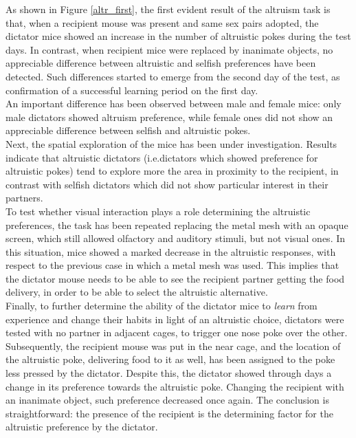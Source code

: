 \documentclass[12pt, a4paper]{article}
\begin{document}
As shown in Figure \ref{altr_first}, the first evident result of the altruism task is that, when a recipient mouse was present and same sex pairs adopted, the dictator mice showed an increase in the number of altruistic pokes during the test days. In contrast, when recipient mice were replaced by inanimate objects, no appreciable difference between altruistic and selfish preferences have been detected. Such differences started to emerge from the second day of the test, as confirmation of a successful learning period on the first day. \\
An important difference has been observed between male and female mice:  only male dictators showed altruism preference, while female ones did not show an appreciable difference between selfish and altruistic pokes.\\
Next, the spatial exploration of the mice has been under investigation. Results indicate that altruistic dictators (i.e.dictators which showed preference for altruistic pokes) tend to explore more the area in proximity to the recipient, in contrast with selfish dictators which did not show particular interest in their partners.\\
To test whether visual interaction plays a role determining the altruistic preferences, the task has been repeated replacing the metal mesh with an opaque screen, which still allowed olfactory and auditory stimuli, but not visual ones. In this situation, mice showed a marked decrease in the altruistic responses, with respect to the previous case in which a metal mesh was used. This implies that the dictator mouse needs to be able to see the recipient partner getting the food delivery, in order to be able to select the altruistic alternative.\\
Finally, to further determine the ability of the dictator mice to \textit{learn} from experience and change their habits in light of an altruistic choice, dictators were tested with no partner in adjacent cages, to trigger one nose poke over the other. Subsequently, the recipient mouse was put in the near cage, and the location of the altruistic poke, delivering food to it as well, has been assigned to the poke less pressed by the dictator. Despite this, the dictator showed through days a change in its preference towards the altruistic poke. Changing the recipient with an inanimate object, such preference decreased once again. The conclusion is straightforward: the presence of the recipient is the determining factor for the altruistic preference by the dictator.
\\
\end{document}
